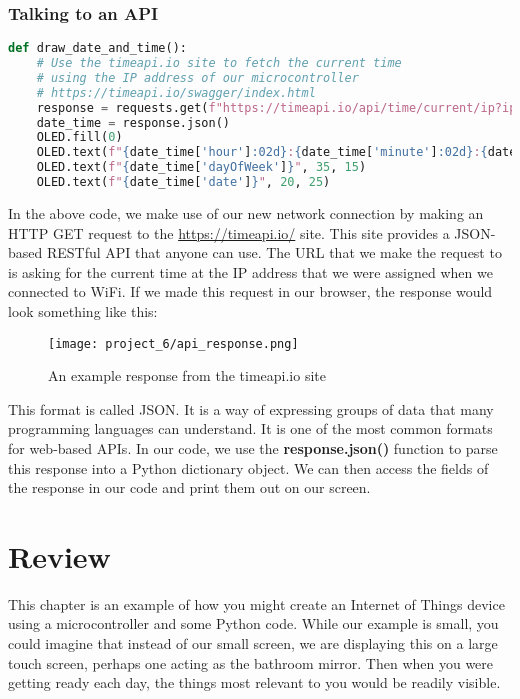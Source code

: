 \subsubsection{Talking to an API}
\begin{lstlisting}[language=Python,caption=Making Web Requests]
def draw_date_and_time():
    # Use the timeapi.io site to fetch the current time
    # using the IP address of our microcontroller
    # https://timeapi.io/swagger/index.html
    response = requests.get(f"https://timeapi.io/api/time/current/ip?ipAddress={IP_ADDRESS}")
    date_time = response.json()
    OLED.fill(0)
    OLED.text(f"{date_time['hour']:02d}:{date_time['minute']:02d}:{date_time['seconds']:02d}", 30, 5)
    OLED.text(f"{date_time['dayOfWeek']}", 35, 15)
    OLED.text(f"{date_time['date']}", 20, 25)
\end{lstlisting}

In the above code, we make use of our new network connection by making an HTTP GET request to the \url{https://timeapi.io/}
site. This site provides a JSON-based RESTful API that anyone can use. The URL that we make the request to is
asking for the current time at the IP address that we were assigned when we connected to WiFi. If we made this request
in our browser, the response would look something like this:

\begin{figure}[H]
    \centering
    \texttt{[image: project\_6/api\_response.png]}
    \caption{An example response from the timeapi.io site}
\end{figure}

This format is called JSON. It is a way of expressing groups of data that many programming languages can
understand. It is one of the most common formats for web-based APIs. In our code, we use the \textbf{response.json()}
function to parse this response into a Python dictionary object. We can then access the fields of the response in
our code and print them out on our screen.

\section{Review}
This chapter is an example of how you might create an Internet of Things device using a microcontroller and
some Python code. While our example is small, you could imagine that instead of our small screen, we are
displaying this on a large touch screen, perhaps one acting as the bathroom mirror. Then when you were getting
ready each day, the things most relevant to you would be readily visible.

